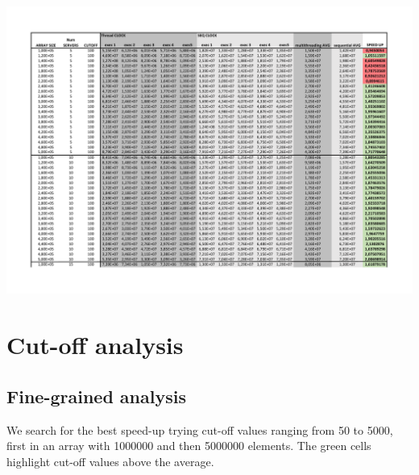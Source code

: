 \documentclass{article}
\begin{document}
\newpage
\hspace*{-1.5in}
\includegraphics[page=3, width=1.5\linewidth]{imgs/ServerNumAnalysis.pdf}%
\endgroup


\clearpage

\section{Cut-off analysis}
\subsection{Fine-grained analysis}\label{CO1}
We search for the best speed-up trying cut-off values ranging from 50 to 5000, first in an array with 1000000 and then 5000000 elements. The green cells highlight cut-off values above the average.
\end{document}
